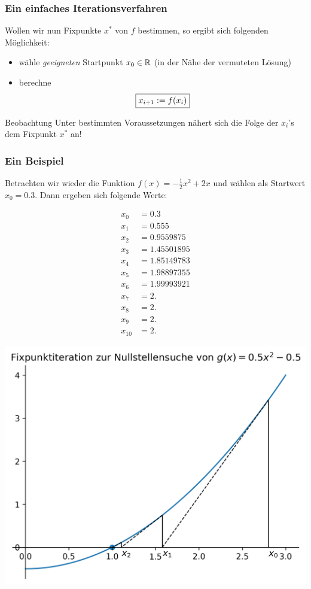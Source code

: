 \documentclass{beamer}
\begin{document}
\begin{frame} \frametitle{Ein einfaches Iterationsverfahren}
	Wollen wir nun Fixpunkte $x^\ast$ von $f$ bestimmen, so ergibt sich folgenden Möglichkeit:
	\begin{itemize}
		\item wähle \textit{geeigneten} Startpunkt $x_0 \in \mathbb{R}$ (in der Nähe der vermuteten Lösung)
		\item berechne 
		\begin{equation*}
				\fbox{$x_{i+1} \mathrel{:=} f(x_i)$}
		\end{equation*}
	\end{itemize}
	\begin{block}{Beobachtung}
		Unter bestimmten Voraussetzungen nähert sich die Folge der $x_i$'s dem Fixpunkt $x^\ast$ an!
	\end{block}
\end{frame}

\begin{frame} \frametitle{Ein Beispiel}
	Betrachten wir wieder die Funktion $f(x) = -\tfrac{1}{2} x^2 + 2x$ und wählen als Startwert $x_0 = 0.3$.
	Dann ergeben sich folgende Werte:
	
	\begin{minipage}{\dimexpr0.3\linewidth-\fboxrule-\fboxsep}
		\footnotesize
		\begin{align*}
			x_0 &= 0.3    \\
			x_1 &= 0.555  \\
			x_2 &= 0.9559875  \\
			x_3 &= 1.45501895 \\
			x_4 &= 1.85149783  \\
			x_5 &= 1.98897355 \\
			x_6 &= 1.99993921  \\
			x_7 &= 2. \\
			x_8 &= 2. \\
			x_9 &= 2. \\
			x_{10} &= 2.
		\end{align*}
	\end{minipage}
	\begin{minipage}{\dimexpr0.7\linewidth-\fboxrule-\fboxsep}
		\includegraphics[width=\linewidth]{tut03_fixpunktiteration.png}
	\end{minipage}
\end{frame}
\end{document}
